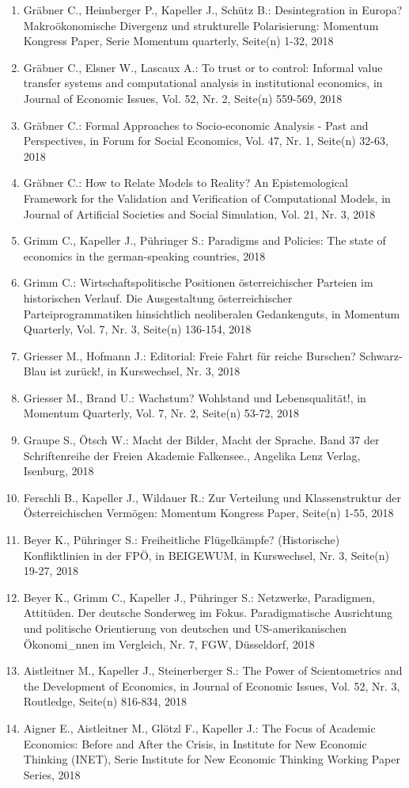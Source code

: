 \begin{enumerate}
	 \item Gräbner C., Heimberger P., Kapeller J., Schütz B.: Desintegration in Europa? Makroökonomische Divergenz und strukturelle Polarisierung: Momentum Kongress Paper, Serie Momentum quarterly, Seite(n) 1-32, 2018
	 \item Gräbner C., Elsner W., Lascaux A.: To trust or to control: Informal value transfer systems and computational analysis in institutional economics, in Journal of Economic Issues, Vol. 52, Nr. 2, Seite(n) 559-569, 2018
	 \item Gräbner C.: Formal Approaches to Socio-economic Analysis - Past and Perspectives, in Forum for Social Economics, Vol. 47, Nr. 1, Seite(n) 32-63, 2018
	 \item Gräbner C.: How to Relate Models to Reality? An Epistemological Framework for the Validation and Verification of Computational Models, in Journal of Artificial Societies and Social Simulation, Vol. 21, Nr. 3, 2018
	 \item Grimm C., Kapeller J., Pühringer S.: Paradigms and Policies: The state of economics in the german-speaking countries, 2018
	 \item Grimm C.: Wirtschaftspolitische Positionen österreichischer Parteien im historischen Verlauf. Die Ausgestaltung österreichischer Parteiprogrammatiken hinsichtlich neoliberalen Gedankenguts, in Momentum Quarterly, Vol. 7, Nr. 3, Seite(n) 136-154, 2018
	 \item Griesser M., Hofmann J.: Editorial: Freie Fahrt für reiche Burschen? Schwarz-Blau ist zurück!, in Kurswechsel, Nr. 3, 2018
	 \item Griesser M., Brand U.: Wachstum? Wohlstand und Lebensqualität!, in Momentum Quarterly, Vol. 7, Nr. 2, Seite(n) 53-72, 2018
	 \item Graupe S., Ötsch W.: Macht der Bilder, Macht der Sprache. Band 37 der Schriftenreihe der Freien Akademie Falkensee., Angelika Lenz Verlag, Isenburg, 2018
	 \item Ferschli B., Kapeller J., Wildauer R.: Zur Verteilung und Klassenstruktur der Österreichischen Vermögen: Momentum Kongress Paper, Seite(n) 1-55, 2018
	 \item Beyer K., Pühringer S.: Freiheitliche Flügelkämpfe? (Historische) Konfliktlinien in der FPÖ, in BEIGEWUM, in Kurswechsel, Nr. 3, Seite(n) 19-27, 2018
	 \item Beyer K., Grimm C., Kapeller J., Pühringer S.: Netzwerke, Paradigmen, Attitüden. Der deutsche Sonderweg im Fokus. Paradigmatische Ausrichtung und politische Orientierung von deutschen und US-amerikanischen Ökonomi\_nnen im Vergleich, Nr. 7, FGW, Düsseldorf, 2018
	 \item Aistleitner M., Kapeller J., Steinerberger S.: The Power of Scientometrics and the Development of Economics, in Journal of Economic Issues, Vol. 52, Nr. 3, Routledge, Seite(n) 816-834, 2018
	 \item Aigner E., Aistleitner M., Glötzl F., Kapeller J.: The Focus of Academic Economics: Before and After the Crisis, in Institute for New Economic Thinking (INET), Serie Institute for New Economic Thinking  Working Paper Series, 2018
\end{enumerate}
